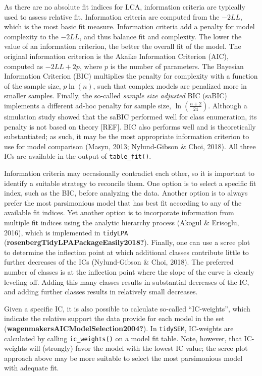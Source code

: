\documentclass[
  ,man,floatsintext]{apa6}
\begin{document}
As there are no absolute fit indices for LCA,
information criteria are typically used to assess relative fit.
Information criteria are computed from the \(-2LL\),
which is the most basic fit measure.
Information criteria add a penalty for model complexity to the \(-2LL\), and thus balance fit and complexity.
The lower
the value of an information criterion, the better the overall fit of the
model.
The original information criterion is the Akaike Information Criterion (AIC),
computed as \(-2LL+2p\), where \(p\) is the number of parameters.
The Bayesian Information Criterion (BIC) multiplies the penalty for complexity with a function of the sample size, \(p \ln(n)\),
such that complex models are penalized more in smaller samples.
Finally,
the so-called \emph{sample size adjusted} BIC (saBIC) implements a different ad-hoc penalty for sample size,
\(\ln(\frac{n + 2}{24})\).
Although a simulation study showed that the saBIC performed well for class enumeration,
its penalty is not based on theory {[}REF{]}.
BIC also performs well and is theoretically substantiated;
as such, it may be the most appropriate information criterion to use for model comparison (Masyn, 2013; Nylund-Gibson \& Choi, 2018).
All three ICs are available in the output of \texttt{table\_fit()}.

Information criteria may occasionally contradict each other, so it is
important to identify a suitable strategy to reconcile them.
One option is to select a specific fit index, such as the BIC,
before analyzing the data.
Another option is to always prefer the most parsimonious model that has best fit according to any of the available fit indices.
Yet another option is to incorporate information from multiple fit indices using the analytic hierarchy process (Akogul \& Erisoglu, 2016),
which is implemented in \texttt{tidyLPA} (\textbf{rosenbergTidyLPAPackageEasily2018?}).
Finally, one can use a scree plot to determine the inflection point at which additional classes contribute little to further decreases of the ICs (Nylund-Gibson \& Choi, 2018).
The preferred number of classes is at the inflection point where the slope of the curve is clearly leveling off.
Adding this many classes results in substantial decreases of the IC,
and adding further classes results in relatively small decreases.

Given a specific IC,
it is also possible to calculate so-called ``IC-weights'',
which indicate the relative support the data provide for each model in the set (\textbf{wagenmakersAICModelSelection2004?}).
In \texttt{tidySEM}, IC-weights are calculated by calling \texttt{ic\_weights()} on a model fit table.
Note, however, that IC-weights will (strongly) favor the model with the lowest IC value;
the scree plot approach above may be more suitable to select the most parsimonious model with adequate fit.
\end{document}
